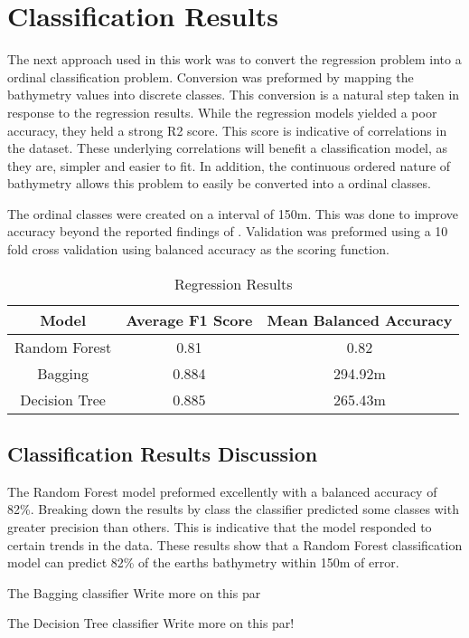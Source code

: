 \section{Classification Results}
\setlength{\parindent}{10ex}
The next approach used in this work was to convert the regression problem into a ordinal classification problem.
Conversion was preformed by mapping the bathymetry values into discrete classes.
This conversion is a natural step taken in response to the regression results.
While the regression models yielded a poor accuracy, they held a strong R2 score.
This score is indicative of correlations in the dataset.
These underlying correlations will benefit a classification model, as they are, simpler and easier to fit.
In addition, the continuous ordered nature of bathymetry allows this problem to easily be converted into a ordinal classes.

\par
The ordinal classes were created on a interval of 150m.
This was done to improve accuracy beyond the reported findings of \cite{jena2012prediction}.
Validation was preformed using a 10 fold cross validation using balanced accuracy as the scoring function.

\begin{center}
    \begin{table}[htb]
        \begin{tabular}{|c c c|}
            \hline
			\textbf{Model} & \textbf{Average F1 Score} & \textbf{Mean Balanced Accuracy} \\
			\hline
			Random Forest & 0.81 & 0.82 \\
            Bagging & 0.884 & 294.92m \\
            Decision Tree & 0.885 & 265.43m \\
			\hline
        \end{tabular}
        \label{table:CLASSIFICATION_RESULTS}
        \caption{Regression Results}
    \end{table}
\end{center}

\subsection{Classification Results Discussion}
The Random Forest model preformed excellently with a balanced accuracy of 82\%.
Breaking down the results by class the classifier predicted some classes with greater precision than others.
This is indicative that the model responded to certain trends in the data.
These results show that a Random Forest classification model can predict 82\% of the earths bathymetry within 150m of error.

\par
The Bagging classifier
Write more on this par

\par
The Decision Tree classifier
Write more on this par!

